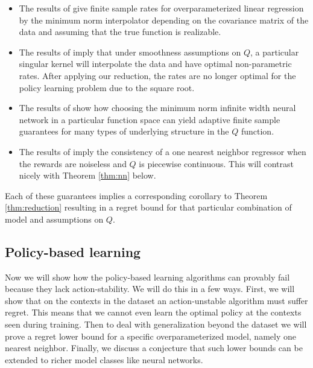 \begin{itemize}
    \item The results of \cite{bartlett2020benign} give finite sample rates for overparameterized linear regression by the minimum norm interpolator depending on the covariance matrix of the data and assuming that the true function is realizable.
    \item The results of \cite{belkin2019does} imply that under smoothness assumptions on $ Q$, a particular singular kernel will interpolate the data and have optimal non-parametric rates. After applying our reduction, the rates are no longer optimal for the policy learning problem due to the square root.
    \item The results of \cite{bach2017breaking} show how choosing the minimum norm infinite width neural network in a particular function space can yield adaptive finite sample guarantees for many types of underlying structure in the $ Q $ function.
    \item The results of \cite{cover1968estimation} imply the consistency of a one nearest neighbor regressor when the rewards are noiseless and $ Q $ is piecewise continuous. This will contrast nicely with Theorem \ref{thm:nn} below.
\end{itemize}
Each of these guarantees implies a corresponding corollary to Theorem \ref{thm:reduction} resulting in a regret bound for that particular combination of model and assumptions on $ Q$.



\subsection{Policy-based learning}

Now we will show how the policy-based learning algorithms can provably fail because they lack action-stability. We will do this in a few ways. First, we will show that on the contexts in the dataset an action-unstable algorithm must suffer regret. This means that we cannot even learn the optimal policy at the contexts seen during training. Then to deal with generalization beyond the dataset we will prove a regret lower bound for a specific overparameterized model, namely one nearest neighbor. Finally, we discuss a conjecture that such lower bounds can be extended to richer model classes like neural networks.

